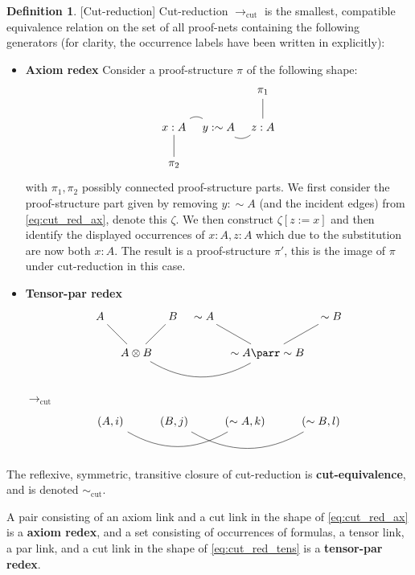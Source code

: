 \documentclass[12pt]{article}
\theoremstyle{plain}
\theoremstyle{definition}
\newtheorem{defn}[thm]{Definition} %
\newcommand{\lto}{\longrightarrow}
\newcommand{\negation}{\sim}
\begin{document}
\begin{defn}\label{def:cut_reduction}[Cut-reduction]
Cut-reduction $\lto_{\operatorname{cut}}$ is the smallest, compatible equivalence relation on the set of all proof-nets containing the following generators (for clarity, the occurrence labels have been written in explicitly):
\begin{itemize}
    \item \textbf{Axiom redex} Consider a proof-structure $\pi$ of the following shape:
    \begin{equation}\label{eq:cut_red_ax}
    \begin{tikzcd}[column sep = tiny]
    & & \pi_1\arrow[d,dash]\\
        x:A\arrow[r,dash, bend left]\arrow[d,dash] & y:\negation A\arrow[r,dash, bend right] & z:A\\
        \pi_2
    \end{tikzcd}
\end{equation}
with $\pi_1,\pi_2$ possibly connected proof-structure parts. We first consider the proof-structure part given by removing $y:\negation A$ (and the incident edges) from \eqref{eq:cut_red_ax},  denote this $\zeta$. We then construct $\zeta[z := x]$ and then identify the displayed occurrences of $x:A, z:A$ which due to the substitution are now both $x:A$. The result is a proof-structure $\pi'$, this is the image of $\pi$ under cut-reduction in this case.
    \item \textbf{Tensor-par redex}
       \begin{equation}\label{eq:cut_red_tens}
        \begin{tikzcd}[column sep = tiny]
            A\arrow[dr,dash] && B\arrow[dl,dash] & \negation A\arrow[dr,dash] && \negation B\arrow[dl,dash]\\
            & A \otimes B\arrow[rrr,dash, bend right] & & & \negation A \parr \negation B
        \end{tikzcd}
    \end{equation}
    $\lto_{\operatorname{cut}}$
    \begin{equation}
    \begin{tikzcd}
        (A,i)\arrow[rr,dash,bend right] & (B,j)\arrow[rr,dash,bend right] & (\negation A, k) & (\negation B, l)
        \end{tikzcd}
    \end{equation}
\end{itemize}
The reflexive, symmetric, transitive closure of cut-reduction is \textbf{cut-equivalence}, and is denoted $\sim_{\operatorname{cut}}$.

A pair consisting of an axiom link and a cut link in the shape of \eqref{eq:cut_red_ax} is a \textbf{axiom redex}, and a set consisting of occurrences of formulas, a tensor link, a par link, and a cut link in the shape of \eqref{eq:cut_red_tens} is a \textbf{tensor-par redex}.
\end{defn}
\end{document}
